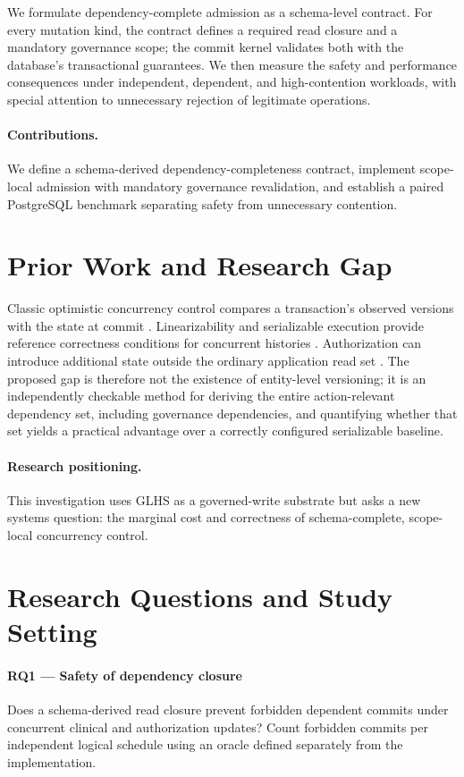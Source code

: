 \documentclass[11pt,a4paper]{article}
\begin{document}
We formulate dependency-complete admission as a schema-level contract. For every mutation kind, the contract defines a required read closure and a mandatory governance scope; the commit kernel validates both with the database's transactional guarantees. We then measure the safety and performance consequences under independent, dependent, and high-contention workloads, with special attention to unnecessary rejection of legitimate operations.

\paragraph{Contributions.} We define a schema-derived dependency-completeness contract, implement scope-local admission with mandatory governance revalidation, and establish a paired PostgreSQL benchmark separating safety from unnecessary contention.

\section{Prior Work and Research Gap}
Classic optimistic concurrency control compares a transaction's observed versions with the state at commit \cite{kung1981}. Linearizability and serializable execution provide reference correctness conditions for concurrent histories \cite{herlihy1990,lamport1978}. Authorization can introduce additional state outside the ordinary application read set \cite{hu2014}. The proposed gap is therefore not the existence of entity-level versioning; it is an independently checkable method for deriving the entire action-relevant dependency set, including governance dependencies, and quantifying whether that set yields a practical advantage over a correctly configured serializable baseline.

\paragraph{Research positioning.} This investigation uses GLHS as a governed-write substrate but asks a new systems question: the marginal cost and correctness of schema-complete, scope-local concurrency control.

\section{Research Questions and Study Setting}
\paragraph{RQ1 — Safety of dependency closure} Does a schema-derived read closure prevent forbidden dependent commits under concurrent clinical and authorization updates? Count forbidden commits per independent logical schedule using an oracle defined separately from the implementation.
\end{document}
